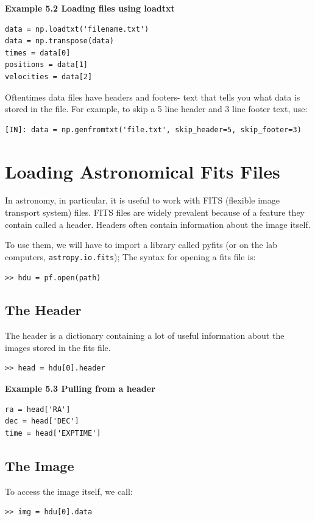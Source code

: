 \textbf{Example 5.2 Loading files using loadtxt} %
\begin{lstlisting}
data = np.loadtxt('filename.txt')
data = np.transpose(data)
times = data[0]
positions = data[1]
velocities = data[2]
\end{lstlisting} %

Oftentimes data files have headers and footers- text that tells you what data is stored in the file. %
For example, to skip a 5 line header and 3 line footer text, use: %

\begin{lstlisting}
[IN]: data = np.genfromtxt('file.txt', skip_header=5, skip_footer=3)
\end{lstlisting} %

\section{Loading Astronomical Fits Files} %
In astronomy, in particular, it is useful to work with FITS (flexible image transport system) files. %
FITS files are widely prevalent because of a feature they contain called a header. %
Headers often contain information about the image itself. %

To use them, we will have to import a library called pyfits (or on the lab computers, \texttt{astropy.io.fits}); %
The syntax for opening a fits file is: %

\begin{lstlisting}
>> hdu = pf.open(path)
\end{lstlisting} %

\subsection{The Header} %
The header is a dictionary containing a lot of useful information about the images stored in the fits file. %

\begin{lstlisting}
>> head = hdu[0].header
\end{lstlisting} %

\textbf{Example 5.3 Pulling from a header} %
\begin{lstlisting}
ra = head['RA']
dec = head['DEC']
time = head['EXPTIME']
\end{lstlisting} %

\subsection{The Image} %
To access the image itself, we call: %

\begin{lstlisting}
>> img = hdu[0].data
\end{lstlisting} %
